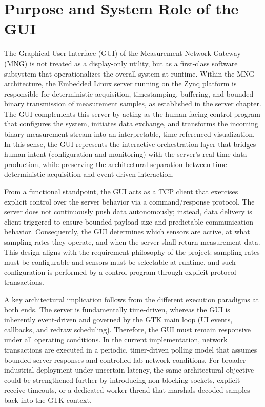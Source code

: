 \section{Purpose and System Role of the GUI}

The Graphical User Interface (GUI) of the Measurement Network Gateway (MNG) is not treated as a display-only utility, but as a first-class software subsystem that operationalizes the overall system at runtime. Within the MNG architecture, the Embedded Linux server running on the Zynq platform is responsible for deterministic acquisition, timestamping, buffering, and bounded binary transmission of measurement samples, as established in the server chapter. The GUI complements this server by acting as the human-facing control program that configures the system, initiates data exchange, and transforms the incoming binary measurement stream into an interpretable, time-referenced visualization. In this sense, the GUI represents the interactive orchestration layer that bridges human intent (configuration and monitoring) with the server's real-time data production, while preserving the architectural separation between time-deterministic acquisition and event-driven interaction.

From a functional standpoint, the GUI acts as a TCP client that exercises explicit control over the server behavior via a command/response protocol. The server does not continuously push data autonomously; instead, data delivery is client-triggered to ensure bounded payload size and predictable communication behavior. Consequently, the GUI determines which sensors are active, at what sampling rates they operate, and when the server shall return measurement data. This design aligns with the requirement philosophy of the project: sampling rates must be configurable and sensors must be selectable at runtime, and such configuration is performed by a control program through explicit protocol transactions.

A key architectural implication follows from the different execution paradigms at both ends. The server is fundamentally time-driven, whereas the GUI is inherently event-driven and governed by the GTK main loop (UI events, callbacks, and redraw scheduling). Therefore, the GUI must remain responsive under all operating conditions. In the current implementation, network transactions are executed in a periodic, timer-driven polling model that assumes bounded server responses and controlled lab-network conditions. For broader industrial deployment under uncertain latency, the same architectural objective could be strengthened further by introducing non-blocking sockets, explicit receive timeouts, or a dedicated worker-thread that marshals decoded samples back into the GTK context.

